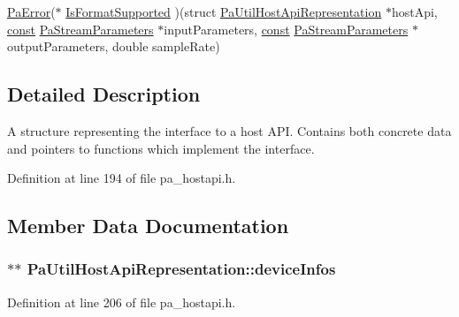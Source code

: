 \begin{DoxyCompactItemize}
\item 
\hyperlink{portaudio_8h_a4949e4a8ef9f9dbe8cbee414ce69841d}{Pa\+Error}($\ast$ \hyperlink{struct_pa_util_host_api_representation_a54205572c891d43272de45be0994c377}{Is\+Format\+Supported} )(struct \hyperlink{struct_pa_util_host_api_representation}{Pa\+Util\+Host\+Api\+Representation} $\ast$host\+Api, \hyperlink{getopt1_8c_a2c212835823e3c54a8ab6d95c652660e}{const} \hyperlink{struct_pa_stream_parameters}{Pa\+Stream\+Parameters} $\ast$input\+Parameters, \hyperlink{getopt1_8c_a2c212835823e3c54a8ab6d95c652660e}{const} \hyperlink{struct_pa_stream_parameters}{Pa\+Stream\+Parameters} $\ast$output\+Parameters, double sample\+Rate)
\end{DoxyCompactItemize}


\subsection{Detailed Description}
A structure representing the interface to a host A\+PI. Contains both concrete data and pointers to functions which implement the interface. 

Definition at line 194 of file pa\+\_\+hostapi.\+h.



\subsection{Member Data Documentation}
\subsubsection[{\texorpdfstring{device\+Infos}{deviceInfos}}]{$\ast$$\ast$ Pa\+Util\+Host\+Api\+Representation\+::device\+Infos}\hypertarget{struct_pa_util_host_api_representation_a48dcfdf57e6d12d33314929ac213ae28}{}\label{struct_pa_util_host_api_representation_a48dcfdf57e6d12d33314929ac213ae28}


Definition at line 206 of file pa\+\_\+hostapi.\+h.

